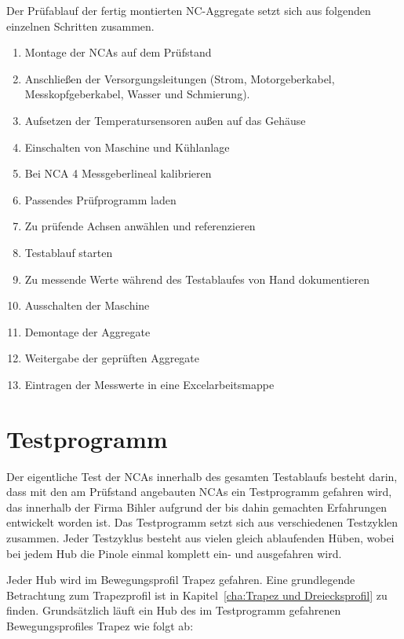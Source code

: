



Der Prüfablauf der fertig montierten NC-Aggregate setzt sich aus folgenden einzelnen Schritten zusammen.

\begin{enumerate}
 \item Montage der NCAs auf dem Prüfstand 
 \item Anschließen der Versorgungsleitungen (Strom, Motorgeberkabel, Messkopfgeberkabel, Wasser und Schmierung).
 \item Aufsetzen der Temperatursensoren außen auf das Gehäuse 
 \item Einschalten von Maschine und Kühlanlage
 \item Bei NCA 4 Messgeberlineal kalibrieren
 \item Passendes Prüfprogramm laden
 \item Zu prüfende Achsen anwählen und referenzieren
 \item Testablauf starten
 \item Zu messende Werte während des Testablaufes von Hand dokumentieren
 \item Ausschalten der Maschine
 \item Demontage der Aggregate
 \item Weitergabe der geprüften Aggregate
 \item Eintragen der Messwerte in eine Excelarbeitsmappe
\end{enumerate}



\section{Testprogramm}\label{cha:Testprogramm}



Der eigentliche Test der NCAs innerhalb des gesamten Testablaufs besteht darin, dass mit den am Prüfstand angebauten NCAs ein Testprogramm gefahren wird, das innerhalb der Firma Bihler aufgrund der bis dahin gemachten Erfahrungen entwickelt worden ist. Das Testprogramm setzt sich aus verschiedenen Testzyklen zusammen. Jeder Testzyklus besteht aus vielen gleich ablaufenden Hüben, wobei bei jedem Hub die Pinole einmal komplett ein- und ausgefahren wird. 

Jeder Hub wird im Bewegungsprofil Trapez gefahren.  Eine grundlegende Betrachtung zum Trapezprofil ist in Kapitel~\ref{cha:Trapez und Dreiecksprofil} zu finden. Grundsätzlich läuft ein Hub des im Testprogramm gefahrenen Bewegungsprofiles Trapez wie folgt ab:

